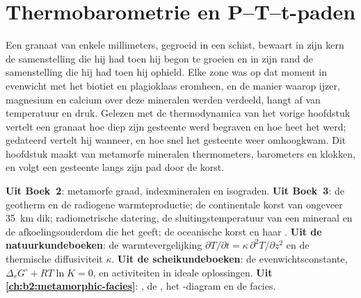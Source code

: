 \chapter{Thermobarometrie en P--T--t-paden}\label{ch:b2:pt-paths}

Een granaat van enkele millimeters, gegroeid in een schist, bewaart in zijn kern de samenstelling
die hij had toen hij begon te groeien en in zijn rand de samenstelling die hij had toen hij ophield. Elke
zone was op dat moment in evenwicht met het biotiet en plagioklaas eromheen, en de
manier waarop ijzer, magnesium en calcium over deze mineralen werden verdeeld, hangt af van temperatuur
en druk. Gelezen met de thermodynamica van het vorige hoofdstuk vertelt een granaat hoe
diep zijn gesteente werd begraven en hoe heet het werd; gedateerd vertelt hij wanneer, en hoe snel het
gesteente weer omhoogkwam. Dit hoofdstuk maakt van metamorfe mineralen thermometers, barometers
en klokken, en volgt een gesteente langs zijn pad door de korst.

\begin{recall}
\textbf{Uit Boek~2}: metamorfe graad, indexmineralen en isograden.
\textbf{Uit Boek~3}: de geotherm en de radiogene warmteproductie; de
continentale korst van ongeveer \qty{35}{km} dik; radiometrische datering, de sluitingstemperatuur
van een mineraal en de afkoelingsouderdom die het geeft; de oceanische korst en haar .
\textbf{Uit de natuurkundeboeken}: de warmtevergelijking $\partial T/\partial t = \kappa\,
\partial^2 T/\partial z^2$ en de thermische diffusiviteit $\kappa$. \textbf{Uit de
scheikundeboeken}: de evenwichtsconstante, $\Delta_r G^\circ + RT\ln K = 0$, en activiteiten in
ideale oplossingen. \textbf{Uit \cref{ch:b2:metamorphic-facies}}: ,
de , het -diagram en de facies.
\end{recall}

